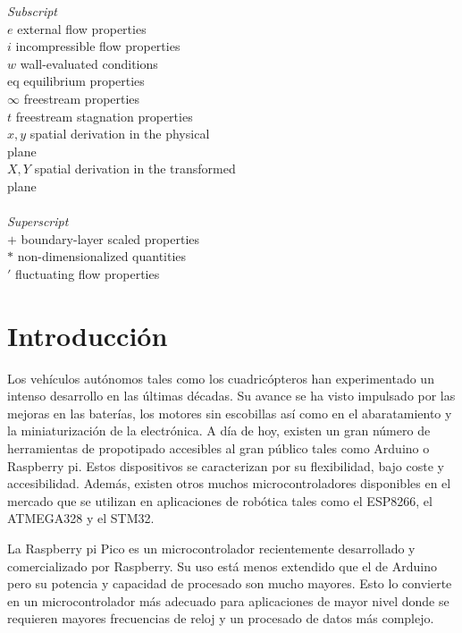 \documentclass[a4paper,12pt]{book}
\begin{document}
\begin{multicols}{2}
\begin{tabbing}
\textit{Subscript}\\
 $e$ \> external flow properties \\
 $i$ \> incompressible flow properties \\
 $w$ \> wall-evaluated conditions  \\
 $\text{eq}$ \> equilibrium properties \\
 $\infty$ \>freestream properties \\
 $t$ \>freestream stagnation properties \\
 $x,y$ \> spatial derivation in the physical \\
  \>  plane \\
 $X,Y$ \> spatial derivation in the transformed\\
  \>  plane \\
 $ $ \>  \\

\textit{Superscript}\\
 $+$ \> boundary-layer scaled properties \\
 $*$ \> non-dimensionalized quantities \\
 $\prime$ \> fluctuating flow properties \\
\end{tabbing}

\end{multicols}

\mainmatter
\pagestyle{fancy}
\clearpage

\chapter{Introducción}\label{chapter:Introduccion}

Los vehículos autónomos tales como los cuadricópteros han experimentado un intenso desarrollo en las últimas décadas. Su avance se ha visto impulsado por las mejoras en las baterías, los motores sin escobillas así como en el abaratamiento y la miniaturización de la electrónica. A día de hoy, existen un gran número de herramientas de propotipado accesibles al gran público tales como Arduino o Raspberry pi. Estos dispositivos se caracterizan por su flexibilidad, bajo coste y accesibilidad. Además, existen otros muchos microcontroladores disponibles en el mercado que se utilizan en aplicaciones de robótica tales como el ESP8266, el ATMEGA328 y el STM32.

La Raspberry pi Pico es un microcontrolador recientemente desarrollado y comercializado por Raspberry. Su uso está menos extendido que el de Arduino pero su potencia y capacidad de procesado son mucho mayores. Esto lo convierte en un microcontrolador más adecuado para aplicaciones de mayor nivel donde se requieren mayores frecuencias de reloj y un procesado de datos más complejo.
\end{document}
